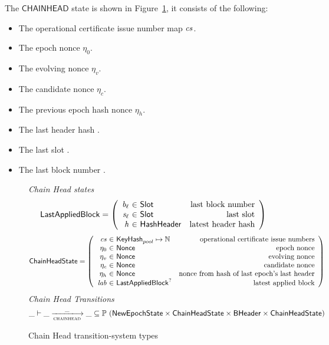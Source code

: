 The $\mathsf{CHAINHEAD}$ state is shown in Figure~\ref{fig:ts-types:chainhead}, it consists of the
following:

\begin{itemize}
  \item The operational certificate issue number map $\mathit{cs}$.
  \item The epoch nonce $\eta_0$.
  \item The evolving nonce $\eta_v$.
  \item The candidate nonce $\eta_c$.
  \item The previous epoch hash nonce $\eta_h$.
  \item The last header hash .
  \item The last slot .
  \item The last block number .
\end{itemize}

\begin{figure}
  \emph{Chain Head states}
  \begin{equation*}
    \LastAppliedBlock =
    \left(
      \begin{array}{r@{~\in~}lr}
        \var{b_\ell} & \Slot & \text{last block number} \\
        \var{s_\ell} & \Slot & \text{last slot} \\
        \var{h} & \HashHeader & \text{latest header hash} \\
      \end{array}
    \right)
  \end{equation*}
  \begin{equation*}
    \ChainHeadState =
    \left(
      \begin{array}{r@{~\in~}lr}
        \var{cs} & \KeyHash_{pool} \mapsto \N & \text{operational certificate issue numbers} \\
        ~\eta_0 & \Nonce & \text{epoch nonce} \\
        ~\eta_v & \Nonce & \text{evolving nonce} \\
        ~\eta_c & \Nonce & \text{candidate nonce} \\
        ~\eta_h & \Nonce & \text{nonce from hash of last epoch's last header} \\
        \var{lab} & \LastAppliedBlock^? & \text{latest applied block} \\
      \end{array}
    \right)
  \end{equation*}
  \emph{Chain Head Transitions}
  \begin{equation*}
    \_ \vdash \var{\_} \trans{chainhead}{\_} \var{\_} \subseteq
    \powerset (\NewEpochState \times \ChainHeadState \times \BHeader \times \ChainHeadState)
  \end{equation*}
  \caption{Chain Head transition-system types}
  \label{fig:ts-types:chainhead}
\end{figure}

